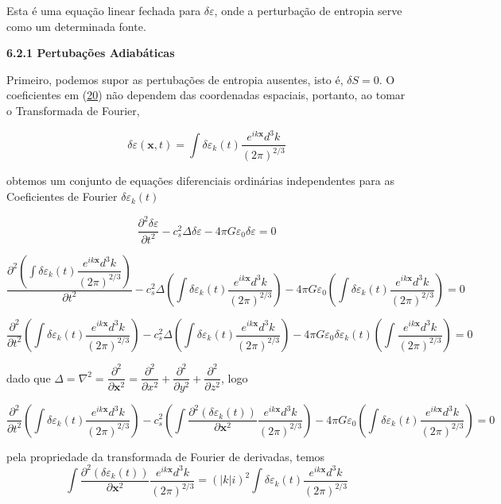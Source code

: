 \documentclass[a4paper,12pt]{article}
\begin{document}
Esta é uma equação linear fechada para $\delta\varepsilon$, onde a perturbação de entropia serve como um
determinada fonte.

\begin{center}
	\textbf{6.2.1 Pertubações Adiabáticas}
\end{center}
Primeiro, podemos supor as pertubações de entropia ausentes, isto é, $\delta S=0$. O
coeficientes em (\hyperref[eq20]{20}) não dependem das coordenadas espaciais, portanto, ao tomar o
Transformada de Fourier,

\begin{equation}\label{eq21}
	\delta\varepsilon (\textbf{x} , t ) = \int \delta\varepsilon_k (t)  \dfrac{e^{ik\textbf{x}}d^3 k}{(2\pi)^{2/3}}
\end{equation}

obtemos um conjunto de equações diferenciais ordinárias independentes para as
Coeficientes de Fourier $\delta\varepsilon_k (t)$

$$\dfrac{\partial^2\delta\varepsilon}{\partial t^2} - c^2_s\Delta\delta\varepsilon - 4\pi G\varepsilon_0\delta\varepsilon = 0$$

$$\dfrac{\partial^2 \left(\int \delta\varepsilon_k (t)  \dfrac{e^{ik\textbf{x}}d^3 k}{(2\pi)^{2/3}} \right)}{\partial t^2} - c^2_s\Delta\left(\int \delta\varepsilon_k (t)  \dfrac{e^{ik\textbf{x}}d^3 k}{(2\pi)^{2/3}} \right) - 4\pi G\varepsilon_0\left(\int \delta\varepsilon_k (t)  \dfrac{e^{ik\textbf{x}}d^3 k}{(2\pi)^{2/3}} \right) = 0$$

$$ \dfrac{\partial^2 }{\partial t^2}\left(\int \delta\varepsilon_k (t)  \dfrac{e^{ik\textbf{x}}d^3 k}{(2\pi)^{2/3}} \right) - c^2_s\Delta\left(\int \delta\varepsilon_k (t) \dfrac{e^{ik\textbf{x}} d^3 k}{(2\pi)^{2/3}} \right) - 4\pi G\varepsilon_0\delta\varepsilon_k (t)\left(\int   \dfrac{e^{ik\textbf{x}}d^3 k}{(2\pi)^{2/3}} \right) = 0$$

dado que $\Delta = \nabla^2 = \dfrac{\partial^2}{\partial\textbf{x}^2} = \dfrac{\partial^2}{\partial x^2} + \dfrac{\partial^2}{\partial y^2} + \dfrac{\partial^2}{\partial z^2}$, logo

$$\dfrac{\partial^2 }{\partial t^2}\left(\int \delta\varepsilon_k (t)  \dfrac{e^{ik\textbf{x}}d^3 k}{(2\pi)^{2/3}} \right)  - c^2_s\left(\int  \dfrac{\partial^2  (\delta\varepsilon_k (t))}{\partial\textbf{x}^2} \dfrac{e^{ik\textbf{x}}d^3 k}{(2\pi)^{2/3}} \right) - 4\pi G\varepsilon_0  \left(\int \delta\varepsilon_k (t)  \dfrac{e^{ik\textbf{x}}d^3 k}{(2\pi)^{2/3}} \right) = 0$$

pela propriedade da transformada de Fourier de derivadas, temos 
$$\int  \dfrac{\partial^2  (\delta\varepsilon_k (t))}{\partial\textbf{x}^2} \dfrac{e^{ik\textbf{x}}d^3 k}{(2\pi)^{2/3}} = (|k|i)^2\int  \delta\varepsilon_k (t) \dfrac{e^{ik\textbf{x}}d^3 k}{(2\pi)^{2/3}}$$
\end{document}
